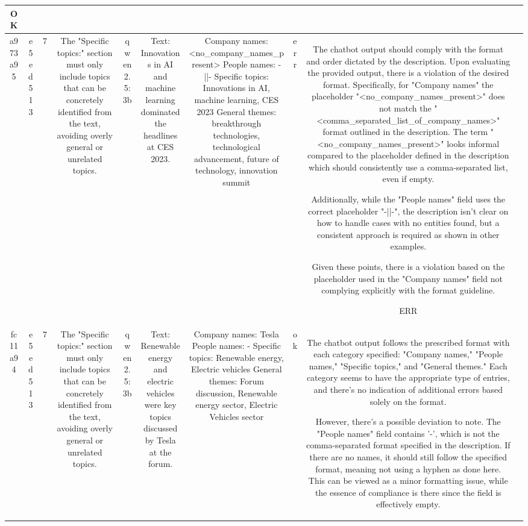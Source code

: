 \begin{table}[h!]
\begin{tabular}{|c|c|c|c|c|c|c|c|c|c|}
OK & \\
\hline
a973a95 & e5ed513 & 7 & The "Specific topics:" section must only include topics that can be concretely identified from the text, avoiding overly general or unrelated topics. & qwen2.5:3b & Text: Innovations in AI and machine learning dominated the headlines at CES 2023. & Company names: <no_company_names_present>
People names: -||-
Specific topics: Innovations in AI, machine learning, CES 2023
General themes: breakthrough technologies, technological advancement, future of technology, innovation summit & err & The chatbot output should comply with the format and order dictated by the description. Upon evaluating the provided output, there is a violation of the desired format. Specifically, for "Company names" the placeholder "<no_company_names_present>" does not match the "<comma_separated_list_of_company_names>" format outlined in the description. The term "<no_company_names_present>" looks informal compared to the placeholder defined in the description which should consistently use a comma-separated list, even if empty. 

Additionally, while the "People names" field uses the correct placeholder "-||-", the description isn't clear on how to handle cases with no entities found, but a consistent approach is required as shown in other examples.

Given these points, there is a violation based on the placeholder used in the "Company names" field not complying explicitly with the format guideline.

ERR & \\
\hline
fc11a94 & e5ed513 & 7 & The "Specific topics:" section must only include topics that can be concretely identified from the text, avoiding overly general or unrelated topics. & qwen2.5:3b & Text: Renewable energy and electric vehicles were key topics discussed by Tesla at the forum. & Company names: Tesla
People names: -
Specific topics: Renewable energy, Electric vehicles
General themes: Forum discussion, Renewable energy sector, Electric Vehicles sector & ok & The chatbot output follows the prescribed format with each category specified: "Company names," "People names," "Specific topics," and "General themes." Each category seems to have the appropriate type of entries, and there's no indication of additional errors based solely on the format.

However, there's a possible deviation to note. The "People names" field contains '-', which is not the comma-separated format specified in the description. If there are no names, it should still follow the specified format, meaning not using a hyphen as done here. This can be viewed as a minor formatting issue, while the essence of compliance is there since the field is effectively empty.


\end{tabular}
\end{table}
